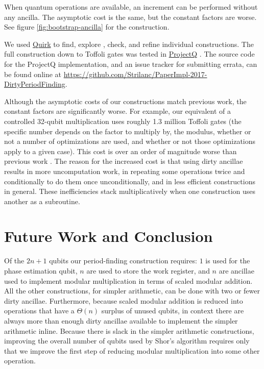 \documentclass[twocolumn]{article}
\begin{document}
When quantum operations are available, an increment can be performed without any ancilla.
The asymptotic cost is the same, but the constant factors are worse.
See figure \ref{fig:bootstrap-ancilla} for the construction.

We used \href{https://github.com/Strilanc/Quirk}{Quirk} \cite{quirk2016} to find, explore \cite{victor2013}, check, and refine individual constructions.
The full construction down to Toffoli gates was tested in \href{https://github.com/ProjectQ-Framework/ProjectQ}{ProjectQ} \cite{projq2016}.
The source code for the ProjectQ implementation, and an issue tracker for submitting errata, can be found online at \href{https://github.com/Strilanc/PaperImpl-2017-DirtyPeriodFinding}{https://github.com/Strilanc/PaperImpl-2017-DirtyPeriodFinding}.

Although the asymptotic costs of our constructions match previous work, the constant factors are significantly worse.
For example, our equivalent of a controlled 32-qubit multiplication uses roughly 1.3 million Toffoli gates (the specific number depends on the factor to multiply by, the modulus, whether or not a number of optimizations are used, and whether or not those optimizations apply to a given case).
This cost is over an order of magnitude worse than previous work \cite{haner2016}.
The reason for the increased cost is that using dirty ancillae results in more uncomputation work, in repeating some operations twice and conditionally to do them once unconditionally, and in less efficient constructions in general.
These inefficiencies stack multiplicatively when one construction uses another as a subroutine.


\section{Future Work and Conclusion} \label{sec:conclusion}

Of the $2n+1$ qubits our period-finding construction requires: $1$ is used for the phase estimation qubit, $n$ are used to store the work register, and $n$ are ancillae used to implement modular multiplication in terms of scaled modular addition.
All the other constructions, for simpler arithmetic, can be done with two or fewer dirty ancillae.
Furthermore, because scaled modular addition is reduced into operations that have a $\Theta(n)$ surplus of unused qubits, in context there are always more than enough dirty ancillae available to implement the simpler arithmetic inline.
Because there is slack in the simpler arithmetic constructions, improving the overall number of qubits used by Shor's algorithm requires only that we improve the first step of reducing modular multiplication into some other operation.
\end{document}
